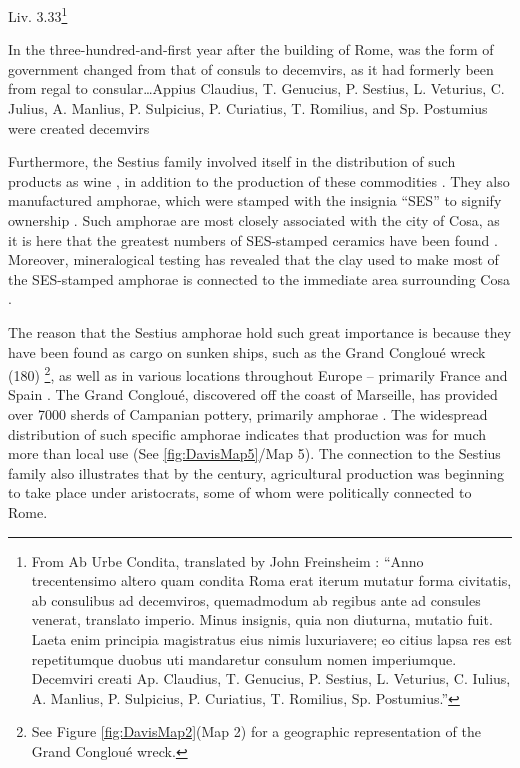 \begin{aquote}{Liv. 3.33\footnote{From Ab Urbe Condita, translated by John Freinsheim \textcite{Livy_1744}: “Anno trecentensimo altero quam condita Roma erat iterum mutatur forma civitatis, ab consulibus ad decemviros, quemadmodum ab regibus ante ad consules venerat, translato imperio. Minus insignis, quia non diuturna, mutatio fuit. Laeta enim principia magistratus eius nimis luxuriavere; eo citius lapsa res est repetitumque duobus uti mandaretur consulum nomen imperiumque. Decemviri creati Ap. Claudius, T. Genucius, P. Sestius, L. Veturius, C. Iulius, A. Manlius, P. Sulpicius, P. Curiatius, T. Romilius, Sp. Postumius.”}}
	
In the three-hundred-and-first year after the building of Rome, was the form of government changed from that of consuls to decemvirs, as it had formerly been from regal to consular…Appius Claudius, T. Genucius, P. Sestius, L. Veturius, C. Julius, A. Manlius, P. Sulpicius, P. Curiatius, T. Romilius, and Sp. Postumius were created decemvirs
\end{aquote}
Furthermore, the Sestius family involved itself in the distribution of such products as wine \parencites[16]{Purcell_1985}[119]{Storey_2004}, in addition to the production of these commodities \parencite[293]{Wilson_2012}. They also manufactured amphorae, which were stamped with the insignia “SES” to signify ownership \parencite[342--344]{Will_1979}. Such amphorae are most closely associated with the city of Cosa, as it is here that the greatest numbers of SES-stamped ceramics have been found \parencite[129]{Manacorda_1978}. Moreover, mineralogical testing has revealed that the clay used to make most of the SES-stamped amphorae is connected to the immediate area surrounding Cosa \parencite[345]{Will_1979}. 

The reason that the Sestius amphorae hold such great importance is because they have been found as cargo on sunken ships, such as the Grand Congloué wreck (180\BC)
\footnote{See Figure \ref{fig:DavisMap2}(Map 2) for a geographic representation of the Grand Congloué wreck.}, as well as in various locations throughout Europe – primarily France and Spain \parencite[125--127]{Manacorda_1978}. The Grand Congloué, discovered off the coast of Marseille, has provided over \num{7000} sherds of Campanian pottery, primarily amphorae \parencite{Strauss_2013}. The widespread distribution of such specific amphorae indicates that production was for much more than local use (See \ref{fig:DavisMap5}/Map 5). The connection to the Sestius family also illustrates that by the  century\BC, agricultural production was beginning to take place under aristocrats, some of whom were politically connected to Rome.

